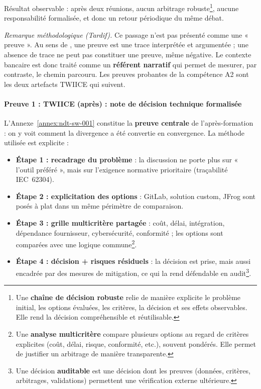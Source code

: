Résultat observable : après deux réunions, aucun arbitrage robuste\footnote{Une \textbf{chaîne de décision robuste} relie de manière explicite le problème initial, les options évaluées, les critères, la décision et ses effets observables. Elle rend la décision compréhensible et réutilisable.}, aucune responsabilité formalisée, et donc un retour périodique du même débat.

\medskip

\textit{Remarque méthodologique (Tardif).} Ce passage n'est pas présenté comme une « preuve ». Au sens de \citet{tardif2006}, une preuve est une trace interprétée et argumentée ; une absence de trace ne peut pas constituer une preuve, même négative. Le contexte bancaire est donc traité comme un \textbf{référent narratif} qui permet de mesurer, par contraste, le chemin parcouru. Les preuves probantes de la compétence A2 sont les deux artefacts TWIICE qui suivent.

\paragraph{Preuve 1 : TWIICE (après) : note de décision technique formalisée}

L'Annexe~\ref{annex:ndt-sw-001} constitue la \textbf{preuve centrale} de l'après-formation : on y voit comment la divergence a été convertie en convergence. La méthode utilisée est explicite :

\begin{itemize}
  \item \textbf{Étape 1 : recadrage du problème} : la discussion ne porte plus sur « l'outil préféré », mais sur l'exigence normative prioritaire (traçabilité IEC~62304).
  \item \textbf{Étape 2 : explicitation des options} : GitLab, solution custom, JFrog sont posés à plat dans un même périmètre de comparaison.
  \item \textbf{Étape 3 : grille multicritère partagée} : coût, délai, intégration, dépendance fournisseur, cybersécurité, conformité ; les options sont comparées avec une logique commune\footnote{Une \textbf{analyse multicritère} compare plusieurs options au regard de critères explicites (coût, délai, risque, conformité, etc.), souvent pondérés. Elle permet de justifier un arbitrage de manière transparente.}.
  \item \textbf{Étape 4 : décision + risques résiduels} : la décision est prise, mais aussi encadrée par des mesures de mitigation, ce qui la rend défendable en audit\footnote{Une décision \textbf{auditable} est une décision dont les preuves (données, critères, arbitrages, validations) permettent une vérification externe ultérieure.}.
\end{itemize}

